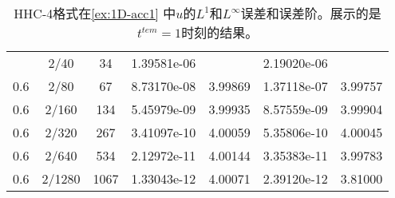 \begin{table}[htbp]
	\caption{HHC-4格式在\cref{ex:1D-acc1} 中$u$的$L^1$和$L^\infty$误差和误差阶。展示的是$t^{tem} = 1$时刻的结果。}
	\label{ta:1D-ex1-HHC4}
	\centering
	\begin{tabular}{ccccccc}
		\toprule
		\titleintable
		\midrule
		0.6 & 2/40   & 34   & 1.39581e-06 &         & 2.19020e-06 &         \\
		0.6 & 2/80   & 67   & 8.73170e-08 & 3.99869 & 1.37118e-07 & 3.99757 \\
		0.6 & 2/160  & 134  & 5.45979e-09 & 3.99935 & 8.57559e-09 & 3.99904 \\
		0.6 & 2/320  & 267  & 3.41097e-10 & 4.00059 & 5.35806e-10 & 4.00045 \\
		0.6 & 2/640  & 534  & 2.12972e-11 & 4.00144 & 3.35383e-11 & 3.99783 \\
		0.6 & 2/1280 & 1067 & 1.33043e-12 & 4.00071 & 2.39120e-12 & 3.81000 \\
		\bottomrule
	\end{tabular}
\end{table}
\undef\titleintable